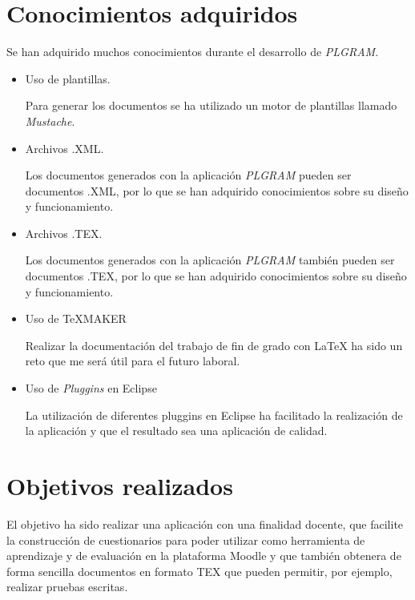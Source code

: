 \section{Conocimientos adquiridos}
Se han adquirido muchos conocimientos durante el desarrollo de \textit{PLGRAM}.
\begin{itemize}
\item Uso de plantillas.

Para generar los documentos se ha utilizado un motor de  plantillas llamado \textit{Mustache}.
\item Archivos .XML.

Los documentos generados con la aplicación \textit{PLGRAM} pueden ser documentos .XML, por lo que se han adquirido conocimientos sobre su diseño y funcionamiento. 
\item Archivos .TEX.

Los documentos generados con la aplicación \textit{PLGRAM} también pueden ser documentos .TEX, por lo que se han adquirido conocimientos sobre su diseño y funcionamiento. 


\item Uso de \TeX{}MAKER

Realizar la documentación del trabajo de fin de grado con \LaTeX{} ha sido un reto que me será útil para el futuro laboral.


\item Uso de \textit{Pluggins} en Eclipse

La utilización de diferentes pluggins en Eclipse ha facilitado la realización de la aplicación y que el resultado sea una aplicación de calidad.
\end{itemize}

\section{Objetivos realizados}
El objetivo ha sido realizar  una aplicación con una finalidad docente, que facilite la construcción de cuestionarios para poder utilizar como herramienta de aprendizaje y de evaluación en la plataforma Moodle y que también  obtenera de forma sencilla documentos en formato TEX que pueden permitir, por ejemplo, realizar pruebas escritas.
